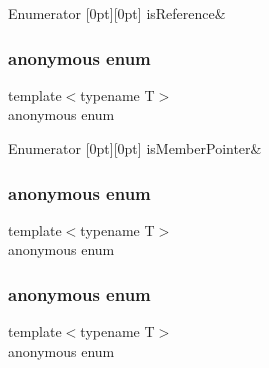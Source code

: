 \begin{DoxyEnumFields}{Enumerator}
[0pt][0pt]{}\mbox{\label{classUtil_1_1TypeTraits_a0839bb273e8995e087dfec963f330b46ac0cdaf0e77f765430820e96bb7cf4619}} 
is\+Reference&\\
\hline

\end{DoxyEnumFields}
\mbox{\label{classUtil_1_1TypeTraits_aee8735f108bb235c2d59b8b823e04086}} 
\subsubsection{\texorpdfstring{anonymous enum}{anonymous enum}}
{\footnotesize\ttfamily template$<$typename T$>$ \\
anonymous enum}

\begin{DoxyEnumFields}{Enumerator}
[0pt][0pt]{}\mbox{\label{classUtil_1_1TypeTraits_aee8735f108bb235c2d59b8b823e04086abe04caa758890fee25930d96123265d2}} 
is\+Member\+Pointer&\\
\hline

\end{DoxyEnumFields}
\mbox{\label{classUtil_1_1TypeTraits_adeb31ff7f9c6d08ecab48c1ab4b5dc2c}} 
\subsubsection{\texorpdfstring{anonymous enum}{anonymous enum}}
{\footnotesize\ttfamily template$<$typename T$>$ \\
anonymous enum}

\mbox{\label{classUtil_1_1TypeTraits_a9378bcbd1bfb5da7bd81aa564423924a}} 
\subsubsection{\texorpdfstring{anonymous enum}{anonymous enum}}
{\footnotesize\ttfamily template$<$typename T$>$ \\
anonymous enum}

